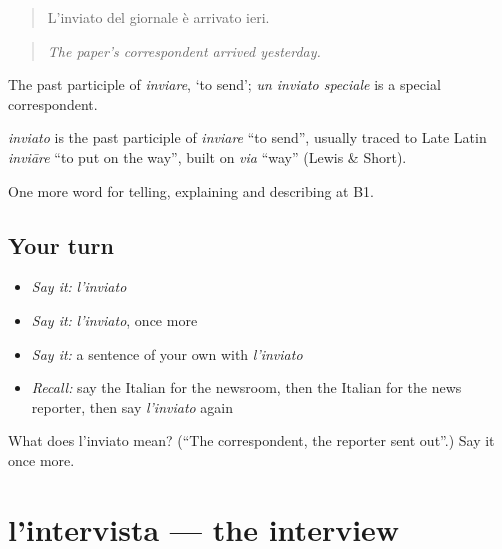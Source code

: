 \begin{quote}
L'inviato del giornale è arrivato ieri.
\end{quote}

\begin{quote}
\emph{The paper's correspondent arrived yesterday.}
\end{quote}

The past participle of \emph{inviare}, ‘to send’; \emph{un inviato speciale} is a special correspondent.

\begin{cousinweb}
\emph{inviato} is the past participle of \emph{inviare} \textquotedblleft{}to send\textquotedblright{}, usually traced to Late Latin \emph{inviāre} \textquotedblleft{}to put on the way\textquotedblright{}, built on \emph{via} \textquotedblleft{}way\textquotedblright{} (Lewis \& Short).
\end{cousinweb}

\begin{grammarlens}[title={What you've built}]
One more word for telling, explaining and describing at B1.
\end{grammarlens}

\subsection*{Your turn}
\begin{itemize}
\raggedright
  \item \emph{Say it:} \emph{l'inviato}
  \item \emph{Say it:} \emph{l'inviato}, once more
  \item \emph{Say it:} a sentence of your own with \emph{l'inviato}
  \item \emph{Recall:} say the Italian for the newsroom, then the Italian for the news reporter, then say \emph{l'inviato} again
\end{itemize}

\begin{tcolorbox}[breakable,colback=teal!4,colframe=teal!35!black,title={Before you move on}]
What does l'inviato mean? (\textquotedblleft{}The correspondent, the reporter sent out\textquotedblright{}.) Say it once more.
\end{tcolorbox}
\section[l'intervista]{l'intervista — the interview}

\label{lesson:IT-C283-intervista}



